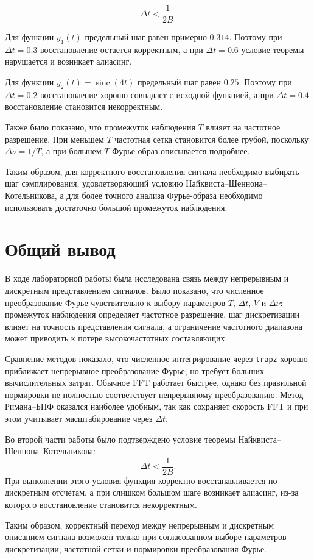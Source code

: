 \documentclass[a4paper, 12pt]{article}
\begin{document}
\[
\Delta t < \frac{1}{2B}.
\]

Для функции \(y_1(t)\) предельный шаг равен примерно \(0.314\). Поэтому при \(\Delta t=0.3\) восстановление остается корректным, а при \(\Delta t=0.6\) условие теоремы нарушается и возникает алиасинг.

Для функции \(y_2(t)=\operatorname{sinc}(4t)\) предельный шаг равен \(0.25\). Поэтому при \(\Delta t=0.2\) восстановление хорошо совпадает с исходной функцией, а при \(\Delta t=0.4\) восстановление становится некорректным.

Также было показано, что промежуток наблюдения \(T\) влияет на частотное разрешение. При меньшем \(T\) частотная сетка становится более грубой, поскольку \(\Delta \nu=1/T\), а при большем \(T\) Фурье-образ описывается подробнее.

Таким образом, для корректного восстановления сигнала необходимо выбирать шаг сэмплирования, удовлетворяющий условию Найквиста--Шеннона--Котельникова, а для более точного анализа Фурье-образа необходимо использовать достаточно большой промежуток наблюдения.


\section{Общий вывод}

В ходе лабораторной работы была исследована связь между непрерывным и дискретным представлением сигналов. Было показано, что численное преобразование Фурье чувствительно к выбору параметров $T$, $\Delta t$, $V$ и $\Delta \nu$: промежуток наблюдения определяет частотное разрешение, шаг дискретизации влияет на точность представления сигнала, а ограничение частотного диапазона может приводить к потере высокочастотных составляющих.

Сравнение методов показало, что численное интегрирование через \texttt{trapz} хорошо приближает непрерывное преобразование Фурье, но требует больших вычислительных затрат. Обычное FFT работает быстрее, однако без правильной нормировки не полностью соответствует непрерывному преобразованию. Метод Римана--БПФ оказался наиболее удобным, так как сохраняет скорость FFT и при этом учитывает масштабирование через $\Delta t$.

Во второй части работы было подтверждено условие теоремы Найквиста--Шеннона--Котельникова:
\[
\Delta t < \frac{1}{2B}.
\]
При выполнении этого условия функция корректно восстанавливается по дискретным отсчётам, а при слишком большом шаге возникает алиасинг, из-за которого восстановление становится некорректным.

Таким образом, корректный переход между непрерывным и дискретным описанием сигнала возможен только при согласованном выборе параметров дискретизации, частотной сетки и нормировки преобразования Фурье.
\end{document}

